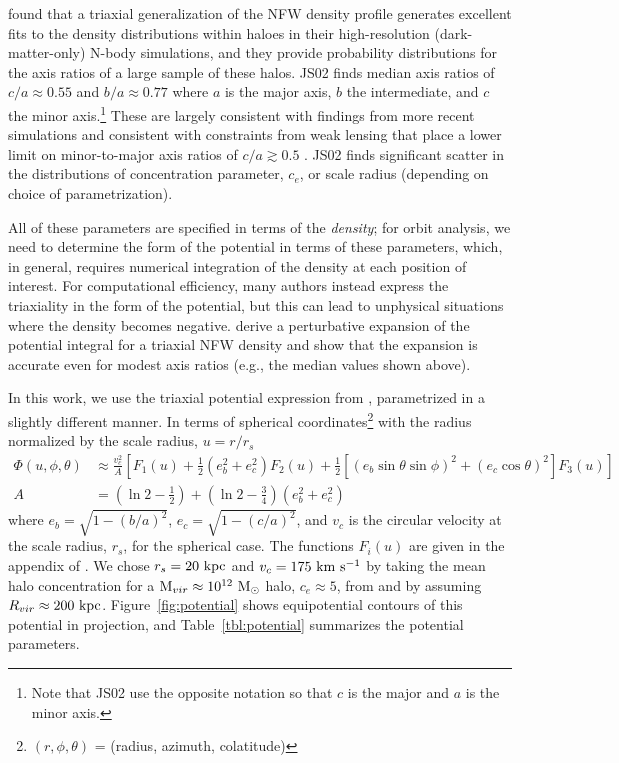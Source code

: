\documentclass[letterpaper,12pt,preprint]{aastex}
\newcommand{\msun}{\ensuremath{\mathrm{M}_\odot}}
\begin{document}
 \citet[][hereafter JS02]{jing02} found that a triaxial generalization of the NFW density profile \citep{navarro96} generates excellent fits to the density distributions within haloes in their high-resolution (dark-matter-only) N-body simulations, and they provide probability distributions for the axis ratios of a large sample of these halos. JS02 finds median axis ratios of $c/a \approx 0.55$ and $b/a \approx 0.77$ where $a$ is the major axis, $b$ the intermediate, and $c$ the minor axis.\footnote{Note that JS02 use the opposite notation so that $c$ is the major and $a$ is the minor axis.} These are largely consistent with findings from more recent simulations \citep[e.g.,][]{millenium, hmm, butsky15} and consistent with constraints from weak lensing that place a lower limit on minor-to-major axis ratios of $c/a\gtrsim0.5$ \citep{vanuitert12}. JS02 finds significant scatter in the distributions of concentration parameter, $c_e$, or scale radius (depending on choice of parametrization). 

All of these parameters are specified in terms of the \emph{density}; for orbit analysis, we need to determine the form of the potential in terms of these parameters, which, in general, requires numerical integration of the density at each position of interest. For computational efficiency, many authors instead express the triaxiality in the form of the potential, but this can lead to unphysical situations where the density becomes negative. \citet{leesuto03} derive a perturbative expansion of the potential integral for a triaxial NFW density and show that the expansion is accurate even for modest axis ratios (e.g., the median values shown above). 

In this work, we use the triaxial potential expression from \citet{leesuto03}, parametrized in a slightly different manner. In terms of spherical coordinates\footnote{$(r,\phi,\theta)$ = (radius, azimuth, colatitude)} with the radius normalized by the scale radius, $u = r/r_s$
\begin{align}
	\Phi(u,\phi,\theta) &\approx \frac{v_c^2}{A}\left[F_1(u) + \frac{1}{2}(e_b^2 + e_c^2)F_2(u) + \frac{1}{2} [(e_b\sin\theta \sin\phi)^2 + (e_c\cos\theta)^2] F_3(u) \right]\label{eq:potential}\\
	A &= \left(\ln2 - \frac{1}{2}\right) + \left(\ln2-\frac{3}{4}\right) (e_b^2 + e_c^2)
\end{align}
where $e_b = \sqrt{1 - (b/a)^2}$, $e_c = \sqrt{1 - (c/a)^2}$, and $v_c$ is the circular velocity at the scale radius, $r_s$, for the spherical case. The functions $F_i(u)$ are given in the appendix of \cite{leesuto03}. We chose $r_s=20~{\rm kpc}$ and $v_c = 175~{\rm km}~{\rm s}^{-1}$ by taking the mean halo concentration for a ${\rm M}_{vir} \approx 10^{12}~\msun$ halo, $c_e\approx5$, from \cite{jing02} and by assuming $R_{vir}\approx200~{\rm kpc}$. Figure~\ref{fig:potential} shows equipotential contours of this potential in projection, and Table~\ref{tbl:potential} summarizes the potential parameters.
\end{document}
